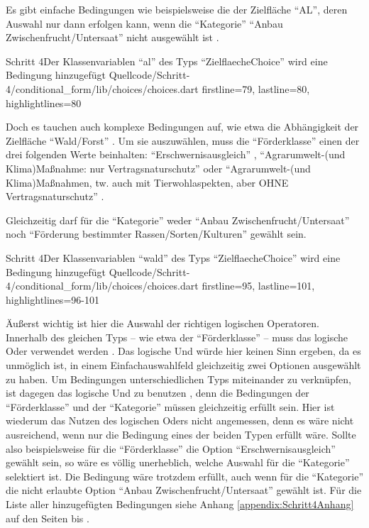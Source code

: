 Es gibt einfache Bedingungen wie beispielsweise die der Zielfläche \enquote{AL},
deren Auswahl nur dann erfolgen kann,
wenn die \enquote{Kategorie} \enquote{Anbau Zwischenfrucht/Untersaat} nicht ausgewählt ist \Lst{\ref{lst:Schritt4al}}. 

\begin{alexlisting}{Schritt 4}{Der Klassenvariablen \enquote{al} des Typs \enquote{ZielflaecheChoice} wird eine Bedingung hinzugefügt}
  {Quellcode/Schritt-4/conditional_form/lib/choices/choices.dart}
  {firstline=79, lastline=80, highlightlines={80}}
  \label{lst:Schritt4al}
\end{alexlisting}

Doch es tauchen auch komplexe Bedingungen auf,
wie etwa die Abhängigkeit der Zielfläche \enquote{Wald/Forst} \Lst{\ref{lst:Schritt4wald}}.
Um sie auszuwählen,
muss die \enquote{Förderklasse} einen der drei folgenden Werte beinhalten:
\enquote{Erschwernisausgleich} ,
\enquote{Agrarumwelt-(und Klima)Maßnahme: nur Vertragsnaturschutz}  oder
\enquote{Agrarumwelt-(und Klima)Maßnahmen, tw. auch mit Tierwohlaspekten, aber OHNE Vertragsnaturschutz} .

Gleichzeitig darf für die \enquote{Kategorie} weder
\enquote{Anbau Zwischenfrucht/Untersaat} 
noch
\enquote{Förderung bestimmter Rassen/Sorten/Kulturen} 
gewählt sein.

\begin{alexlisting}{Schritt 4}{Der Klassenvariablen \enquote{wald} des Typs \enquote{ZielflaecheChoice} wird eine Bedingung hinzugefügt}
  {Quellcode/Schritt-4/conditional_form/lib/choices/choices.dart}
  {firstline=95, lastline=101, highlightlines={96-101}}
  \label{lst:Schritt4wald}
\end{alexlisting}


Äußerst wichtig ist hier die Auswahl der richtigen logischen Operatoren.
Innerhalb des gleichen Typs -- wie etwa der \enquote{Förderklasse} -- muss das logische Oder \IC{||} verwendet werden .
Das logische Und würde hier keinen Sinn ergeben,
da es unmöglich ist,
in einem Einfachauswahlfeld gleichzeitig zwei Optionen ausgewählt zu haben.
Um Bedingungen unterschiedlichen Typs miteinander zu verknüpfen,
ist dagegen das logische Und \IC{&&} zu benutzen ,
denn die Bedingungen der \enquote{Förderklasse} und der \enquote{Kategorie} müssen gleichzeitig erfüllt sein.
Hier ist wiederum das Nutzen des logischen Oders nicht angemessen,
denn es wäre nicht ausreichend,
wenn nur die Bedingung eines der beiden Typen erfüllt wäre.
Sollte also beispielsweise für die \enquote{Förderklasse} die Option \enquote{Erschwernisausgleich} gewählt sein,
so wäre es völlig unerheblich,
welche Auswahl für die \enquote{Kategorie} selektiert ist.
Die Bedingung wäre trotzdem erfüllt,
auch wenn für die \enquote{Kategorie} die nicht erlaubte Option \enquote{Anbau Zwischenfrucht/Untersaat} gewählt ist.
Für die Liste aller hinzugefügten Bedingungen siehe Anhang \ref{appendix:Schritt4Anhang} auf den Seiten \pageref{lst:Schritt4KategorieChoice} bis  \pageref{lst:Schritt4ZieleinheitChoice}.

